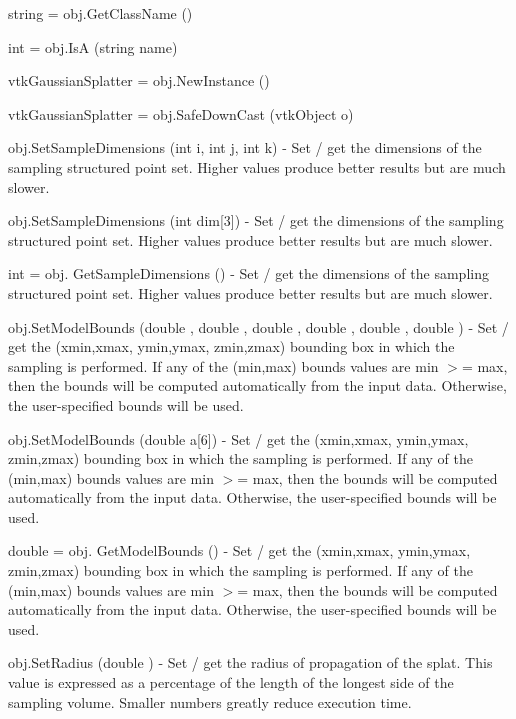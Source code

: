 \begin{DoxyItemize}
\item {\ttfamily string = obj.\-Get\-Class\-Name ()}  
\item {\ttfamily int = obj.\-Is\-A (string name)}  
\item {\ttfamily vtk\-Gaussian\-Splatter = obj.\-New\-Instance ()}  
\item {\ttfamily vtk\-Gaussian\-Splatter = obj.\-Safe\-Down\-Cast (vtk\-Object o)}  
\item {\ttfamily obj.\-Set\-Sample\-Dimensions (int i, int j, int k)} -\/ Set / get the dimensions of the sampling structured point set. Higher values produce better results but are much slower.  
\item {\ttfamily obj.\-Set\-Sample\-Dimensions (int dim\mbox{[}3\mbox{]})} -\/ Set / get the dimensions of the sampling structured point set. Higher values produce better results but are much slower.  
\item {\ttfamily int = obj. Get\-Sample\-Dimensions ()} -\/ Set / get the dimensions of the sampling structured point set. Higher values produce better results but are much slower.  
\item {\ttfamily obj.\-Set\-Model\-Bounds (double , double , double , double , double , double )} -\/ Set / get the (xmin,xmax, ymin,ymax, zmin,zmax) bounding box in which the sampling is performed. If any of the (min,max) bounds values are min $>$= max, then the bounds will be computed automatically from the input data. Otherwise, the user-\/specified bounds will be used.  
\item {\ttfamily obj.\-Set\-Model\-Bounds (double a\mbox{[}6\mbox{]})} -\/ Set / get the (xmin,xmax, ymin,ymax, zmin,zmax) bounding box in which the sampling is performed. If any of the (min,max) bounds values are min $>$= max, then the bounds will be computed automatically from the input data. Otherwise, the user-\/specified bounds will be used.  
\item {\ttfamily double = obj. Get\-Model\-Bounds ()} -\/ Set / get the (xmin,xmax, ymin,ymax, zmin,zmax) bounding box in which the sampling is performed. If any of the (min,max) bounds values are min $>$= max, then the bounds will be computed automatically from the input data. Otherwise, the user-\/specified bounds will be used.  
\item {\ttfamily obj.\-Set\-Radius (double )} -\/ Set / get the radius of propagation of the splat. This value is expressed as a percentage of the length of the longest side of the sampling volume. Smaller numbers greatly reduce execution time.  

\end{DoxyItemize}
